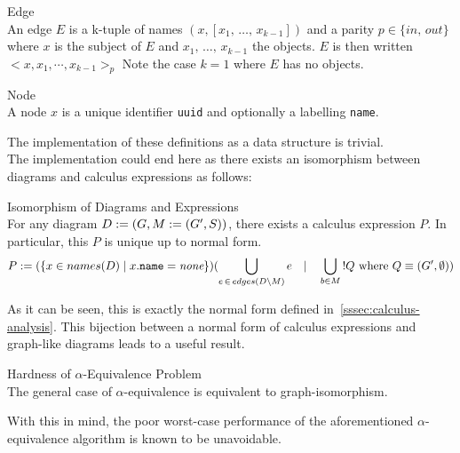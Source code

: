         \begin{definition}{Edge\\}
            An edge $E$ is a k-tuple of names $(x, [x_1, \, \ldots, \, x_{k-1}])$ and a parity $p \in \{in, \, out\}$ where $x$ is the subject of $E$ and $x_1, \, \ldots, \, x_{k-1}$ the objects.
            $E$ is then written $<x, x_1, \cdots, x_{k-1}>_p$
            Note the case $k = 1$ where $E$ has no objects.
        \end{definition}

        \begin{definition}{Node\\}
            A node $x$ is a unique identifier \texttt{uuid} and optionally a labelling \texttt{name}.
        \end{definition}

        The implementation of these definitions as a data structure is trivial.\\

        The implementation could end here as there exists an isomorphism between diagrams and calculus expressions as follows:
        \begin{lemma}{Isomorphism of Diagrams and Expressions\\}
            For any diagram $D := (G, M := (G', S))$, there exists a calculus expression $P$. In particular, this $P$ is unique up to normal form.
            \begin{align*}
                P := (\{x \in names(D) \; | \; x.\texttt{name} = \textit{none}\})(\bigcup_{e \, \in \, edges(D \setminus M)}{e} \quad | \quad \bigcup_{b \in M}{!Q \text{ where } Q \equiv (G', \emptyset)})
            \end{align*}
        \end{lemma}
        As it can be seen, this is exactly the normal form defined in~\ref{sssec:calculus-analysis}.
        This bijection between a normal form of calculus expressions and graph-like diagrams leads to a useful result.

        \begin{corollary*}{Hardness of $\alpha$-Equivalence Problem\\}
            The general case of $\alpha$-equivalence is equivalent to graph-isomorphism.
        \end{corollary*}
        
        With this in mind, the poor worst-case performance of the aforementioned $\alpha$-equivalence algorithm is known to be unavoidable.

